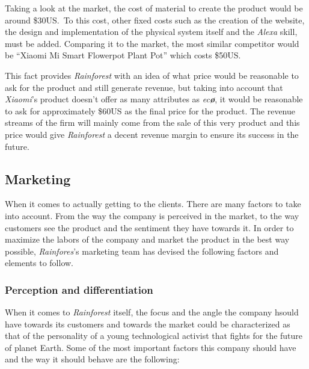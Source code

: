 \documentclass[english,runningheads,a4paper]{llncs}[2018/03/10]
\begin{document}
        Taking a look at the market, the cost of material to create the product
        would be around \$30US.\ To this cost, other fixed costs such as the
        creation of the website, the design and implementation of the physical
        system itself and the \textit{Alexa} skill, must be added. Comparing it
        to the market, the most similar competitor would be ``Xiaomi Mi Smart
        Flowerpot Plant Pot'' which costs \$50US.\

        This fact provides \textit{Rainforest} with an idea of what price would
        be reasonable to ask for the product and still generate revenue, but
        taking into account that \textit{Xiaomi}'s product doesn't offer as many
        attributes as \textit{ec\textbf{\o}}, it would be reasonable to ask for
        approximately \$60US as the final price for the product. The revenue
        streams of the firm will mainly come from the sale of this very product
        and this price would give \textit{Rainforest} a decent revenue margin to
        ensure its success in the future.


    \subsection*{Marketing}

    When it comes to actually getting to the clients. There are many factors to
    take into account. From the way the company is perceived in the market, to
    the way customers see the product and the sentiment they have towards it. In
    order to maximize the labors of the company and market the product in the
    best way possible, \textit{Rainfores}'s marketing team has devised the
    following factors and elements to follow.


        \subsubsection*{Perception and differentiation}

        When it comes to \textit{Rainforest} itself, the focus and the angle the
        company hsould have towards its customers and towards the market could
        be characterized as that of the personality of a young technological
        activist that fights for the future of planet Earth. Some of the most
        important factors this company should have and the way it should behave
        are the following:
\end{document}
